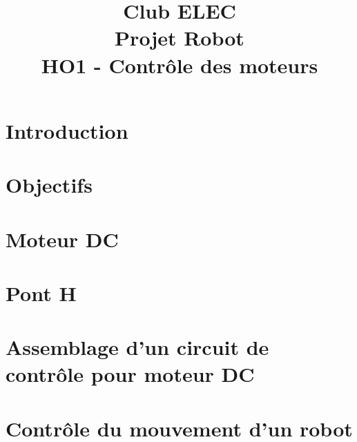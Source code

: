 \documentclass[a4paper,10pt,twoside]{article}
\title{	
	\vspace{2.5cm}
	\normalfont \normalsize 
	\huge Club ELEC\\ 
	\vspace{2.5cm}
	\huge Projet Robot\\
	\vspace{.25cm}
	\Large HO1 - Contrôle des moteurs
	\vspace{2.5cm}
	\centering
}
\begin{document}
\renewcommand{\figurename}{Figure}
\renewcommand{\thepage}{\roman{page}}
\setcounter{page}{1}

\maketitle
\newpage
{}
\pagestyle{main}

\newpage
\null
\thispagestyle{empty}
\newpage
\clearpage

\setcounter{page}{1}

\section*{Introduction}


\section*{Objectifs}


\section*{Moteur DC}


\section*{Pont H}


\section*{Assemblage d'un circuit de contrôle pour moteur DC}


\section*{Contrôle du mouvement d'un robot}

\end{document}
